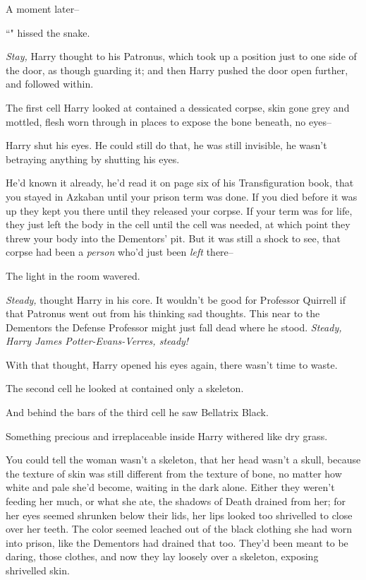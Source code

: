 A moment later\---

``" hissed the snake.

\emph{Stay,} Harry thought to his Patronus, which took up a position just to one side of the door, as though guarding it; and then Harry pushed the door open further, and followed within.

The first cell Harry looked at contained a dessicated corpse, skin gone grey and mottled, flesh worn through in places to expose the bone beneath, no eyes\---

Harry shut his eyes. He could still do that, he was still invisible, he wasn't betraying anything by shutting his eyes.

He'd known it already, he'd read it on page six of his Transfiguration book, that you stayed in Azkaban until your prison term was done. If you died before it was up they kept you there until they released your corpse. If your term was for life, they just left the body in the cell until the cell was needed, at which point they threw your body into the Dementors' pit. But it was still a shock to see, that corpse had been a \emph{person} who'd just been \emph{left} there\---

The light in the room wavered.

\emph{Steady,} thought Harry in his core. It wouldn't be good for Professor Quirrell if that Patronus went out from his thinking sad thoughts. This near to the Dementors the Defense Professor might just fall dead where he stood. \emph{Steady, Harry James Potter-Evans-Verres, steady!}

With that thought, Harry opened his eyes again, there wasn't time to waste.

The second cell he looked at contained only a skeleton.

And behind the bars of the third cell he saw Bellatrix Black.

Something precious and irreplaceable inside Harry withered like dry grass.

You could tell the woman wasn't a skeleton, that her head wasn't a skull, because the texture of skin was still different from the texture of bone, no matter how white and pale she'd become, waiting in the dark alone. Either they weren't feeding her much, or what she ate, the shadows of Death drained from her; for her eyes seemed shrunken below their lids, her lips looked too shrivelled to close over her teeth. The color seemed leached out of the black clothing she had worn into prison, like the Dementors had drained that too. They'd been meant to be daring, those clothes, and now they lay loosely over a skeleton, exposing shrivelled skin.

